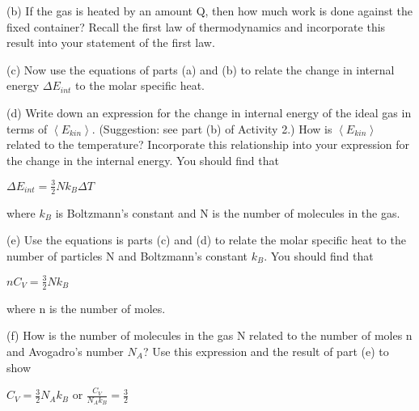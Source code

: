(b) If the gas is heated by an amount Q, then how much work is done
against the fixed container? Recall the first law of thermodynamics
and incorporate this result into your statement of the first law.
\vspace{1in}

(c) Now use the equations of parts (a) and (b) to relate the change
in internal energy \( \Delta E_{int} \) to the molar specific heat.
\vspace{1in}


(d) Write down an expression for  the change in internal
energy of the ideal gas in terms of \( \left\langle E_{kin}\right\rangle  \).
(Suggestion: see part (b) of Activity 2.)
How is \( \left\langle E_{kin}\right\rangle  \) related to the temperature?
Incorporate this relationship into your expression for the change
in the internal energy. You should find that

{\centering \( \Delta E_{int}=\frac{3}{2}Nk_{B}\Delta T \)\par}

where \( k_{B} \) is Boltzmann's constant and N is the number of
molecules in the gas.
\vspace{1in}

(e) Use the equations is parts (c) and (d) to relate the molar specific
heat to the number of particles N and Boltzmann's constant \( k_{B} \).
You should find that
\vspace{1in}

{\centering \( nC_{V}=\frac{3}{2}Nk_{B} \)\par}

where n is the number of moles.
\vspace{1.5in}

(f) How is the number of molecules in the gas N related to the number
of moles n and Avogadro's number \( N_{A} \)? Use this expression
and the result of part (e) to show

{\centering \( C_{V}=\frac{3}{2}N_{A}k_{B} \) or \( \frac{C_{V}}{N_{A}k_{B}}=\frac{3}{2} \)\par}
\vspace{1.5in}

